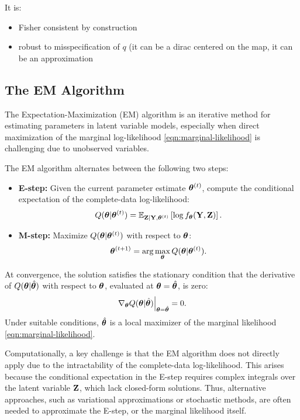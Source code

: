 \documentclass[twoside,11pt]{article}
\begin{document}
It is:
\begin{itemize}
    \item Fisher consistent by construction
    \item robust to misspecification of $q$ (it can be a dirac centered on the map, it can be an approximation
\end{itemize}


\subsection{The EM Algorithm}

The Expectation-Maximization (EM) algorithm is an iterative method for estimating parameters in latent variable models, especially when direct maximization of the marginal log-likelihood \eqref{eqn:marginal-likelihood} is challenging due to unobserved variables.

The EM algorithm alternates between the following two steps:

\begin{itemize}
    \item \textbf{E-step:} Given the current parameter estimate \({\bm{\theta}}^{(t)}\), compute the conditional expectation of the complete-data log-likelihood:
    \[
    Q({\bm{\theta}}|{\bm{\theta}}^{(t)}) = \mathbb{E}_{{\bf Z}|{\bf Y}, {\bm{\theta}}^{(t)}}\left[ \log f_{\bm{\theta}}({\bf Y}, {\bf Z}) \right].
    \]

    \item \textbf{M-step:} Maximize \(Q({\bm{\theta}}|{\bm{\theta}}^{(t)})\) with respect to \({\bm{\theta}}\):
    \[
    {\bm{\theta}}^{(t+1)} = \arg\max_{\bm{\theta}} Q({\bm{\theta}}|{\bm{\theta}}^{(t)}).
    \]
\end{itemize}

At convergence, the solution satisfies the stationary condition that the derivative of \(Q({\bm{\theta}}|\hat{{\bm{\theta}}})\) with respect to \({\bm{\theta}}\), evaluated at \({\bm{\theta}} = \hat{{\bm{\theta}}}\), is zero:
\[
\left. \nabla_{\bm{\theta}} Q({\bm{\theta}}|\hat{{\bm{\theta}}}) \right|_{{\bm{\theta}} = \hat{{\bm{\theta}}}} = 0.
\]
%
Under suitable conditions, \(\hat{{\bm{\theta}}}\) is a local maximizer of the marginal likelihood \eqref{eqn:marginal-likelihood}.


Computationally, a key challenge is that the EM algorithm does not directly apply due to the intractability of the complete-data log-likelihood. This arises because the conditional expectation in the E-step requires complex integrals over the latent variable \({\bf Z}\), which lack closed-form solutions. Thus, alternative approaches, such as variational approximations or stochastic methods, are often needed to approximate the E-step, or the marginal likelihood itself.
\end{document}
